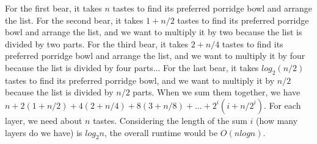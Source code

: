 \documentclass[10pt]{article}
\begin{document}
\begin{enumerate}
    For the first bear, it takes $n$ tastes to find its preferred porridge bowl and arrange the list. For the second bear, it takes $1 + n/2$ tastes to find its preferred porridge bowl and arrange the list, and we want to multiply it by two because the list is divided by two parts. For the third bear, it takes $2+ n/4$ tastes to find its preferred porridge bowl and arrange the list, and we want to multiply it by four because the list is divided by four parts... For the last bear, it takes $log_2 (n/2)$ tastes to find its preferred porridge bowl, and we want to multiply it by $n/2$ because the list is divided by $n/2$ parts. When we sum them together, we have $n + 2(1+n/2) + 4(2+n/4) + 8(3+n/8) +...+ 2^i(i+n/2^i)$. For each layer, we need about $n$ tastes. Considering the length of the sum $i$ (how many layers do we have) is $log_2 n$, the overall runtime would be $O(nlogn)$.
\end{enumerate}
\end{document}
